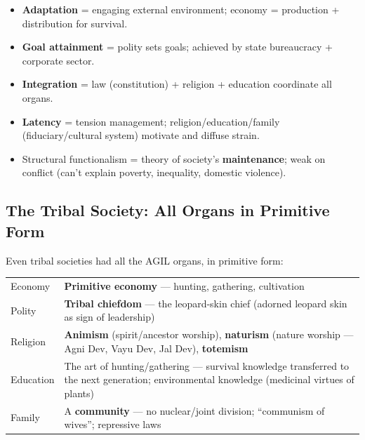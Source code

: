 \begin{QuickRevision}
\begin{itemize}
\item \textbf{Adaptation} = engaging external environment; economy = production + distribution for survival.
\item \textbf{Goal attainment} = polity sets goals; achieved by state bureaucracy + corporate sector.
\item \textbf{Integration} = law (constitution) + religion + education coordinate all organs.
\item \textbf{Latency} = tension management; religion/education/family (fiduciary/cultural system) motivate and diffuse strain.
\item Structural functionalism = theory of society's \textbf{maintenance}; weak on conflict (can't explain poverty, inequality, domestic violence).
\end{itemize}
\end{QuickRevision}

\sectiondivider

\subsection{The Tribal Society: All Organs in Primitive Form}

Even tribal societies had all the AGIL organs, in primitive form:

\begin{center}
\begin{tabularx}{\textwidth}{p{3.5cm} Y}
 &  \\
\midrule
Economy & \textbf{Primitive economy} --- hunting, gathering, cultivation \\
Polity & \textbf{Tribal chiefdom} --- the leopard-skin chief (adorned leopard skin as sign of leadership) \\
Religion & \textbf{Animism} (spirit/ancestor worship), \textbf{naturism} (nature worship --- Agni Dev, Vayu Dev, Jal Dev), \textbf{totemism} \\
Education & The art of hunting/gathering --- survival knowledge transferred to the next generation; environmental knowledge (medicinal virtues of plants) \\
Family & A \textbf{community} --- no nuclear/joint division; ``communism of wives''; repressive laws \\
\bottomrule
\end{tabularx}
\end{center}

